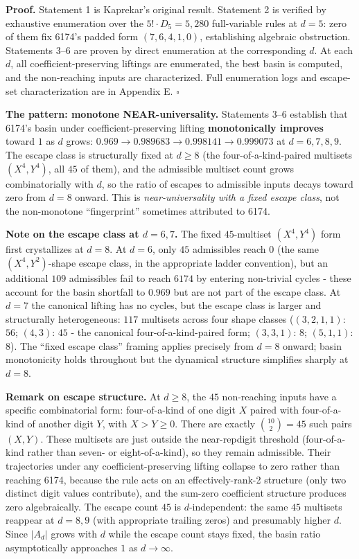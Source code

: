 \documentclass[11pt,letterpaper]{article}
\theoremstyle{paperstyle}
\theoremstyle{paperstyledef}
\theoremstyle{paperstylerem}
\begin{document}
\textbf{Proof.} Statement 1 is Kaprekar's original result. Statement 2
is verified by exhaustive enumeration over the
\(5! \cdot D_5 = 5{,}280\) full-variable rules at \(d = 5\): zero of
them fix 6174's padded form \((7, 6, 4, 1, 0)\), establishing algebraic
obstruction. Statements 3--6 are proven by direct enumeration at the
corresponding \(d\). At each \(d\), all coefficient-preserving liftings
are enumerated, the best basin is computed, and the non-reaching inputs
are characterized. Full enumeration logs and escape-set characterization
are in Appendix E. \(\square\)

\textbf{The pattern: monotone NEAR-universality.} Statements 3--6
establish that 6174's basin under coefficient-preserving lifting
\textbf{monotonically improves} toward \(1\) as \(d\) grows:
\(0.969 \to 0.989683 \to 0.998141 \to 0.999073\) at \(d = 6, 7, 8, 9\).
The escape class is structurally fixed at \(d \geq 8\) (the
four-of-a-kind-paired multisets \((X^4, Y^4)\), all \(45\) of them), and
the admissible multiset count grows combinatorially with \(d\), so the
ratio of escapes to admissible inputs decays toward zero from \(d = 8\)
onward. This is \emph{near-universality with a fixed escape class}, not
the non-monotone ``fingerprint'' sometimes attributed to 6174.

\textbf{Note on the escape class at \(d = 6, 7\).} The fixed
\(45\)-multiset \((X^4, Y^4)\) form first crystallizes at \(d = 8\). At
\(d = 6\), only \(45\) admissibles reach \(0\) (the same
\((X^4, Y^2)\)-shape escape class, in the appropriate ladder
convention), but an additional \(109\) admissibles fail to reach
\(6174\) by entering non-trivial cycles - these account for the basin
shortfall to \(0.969\) but are not part of the escape class. At
\(d = 7\) the canonical lifting has no cycles, but the escape class is
larger and structurally heterogeneous: \(117\) multisets across four
shape classes (\((3,2,1,1)\): \(56\); \((4,3)\): \(45\) - the
canonical four-of-a-kind-paired form; \((3,3,1)\): \(8\); \((5,1,1)\):
\(8\)). The ``fixed escape class'' framing applies precisely from
\(d = 8\) onward; basin monotonicity holds throughout but the dynamical
structure simplifies sharply at \(d = 8\).

\textbf{Remark on escape structure.} At \(d \geq 8\), the \(45\)
non-reaching inputs have a specific combinatorial form: four-of-a-kind
of one digit \(X\) paired with four-of-a-kind of another digit \(Y\),
with \(X > Y \geq 0\). There are exactly \(\binom{10}{2} = 45\) such
pairs \((X, Y)\). These multisets are just outside the near-repdigit
threshold (four-of-a-kind rather than seven- or eight-of-a-kind), so
they remain admissible. Their trajectories under any
coefficient-preserving lifting collapse to zero rather than reaching
6174, because the rule acts on an effectively-rank-2 structure (only two
distinct digit values contribute), and the sum-zero coefficient
structure produces zero algebraically. The escape count \(45\) is
\(d\)-independent: the same \(45\) multisets reappear at \(d = 8, 9\)
(with appropriate trailing zeros) and presumably higher \(d\). Since
\(|A_d|\) grows with \(d\) while the escape count stays fixed, the basin
ratio asymptotically approaches \(1\) as \(d \to \infty\).
\end{document}
